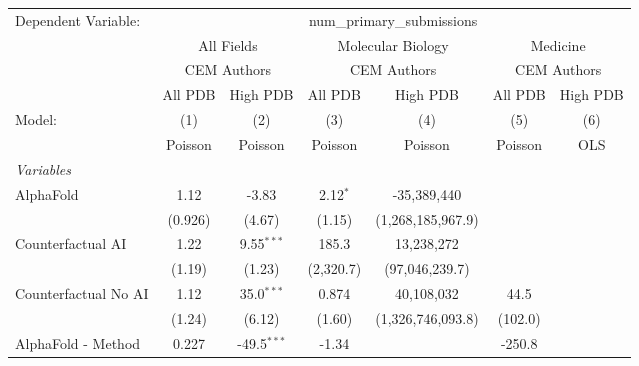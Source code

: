\begingroup
\centering
\begin{tabular}{lcccccc}
   \tabularnewline \midrule \midrule
   Dependent Variable: & \multicolumn{6}{c}{num\_primary\_submissions}\\
 & \multicolumn{2}{c}{All Fields} & \multicolumn{2}{c}{Molecular Biology} & \multicolumn{2}{c}{Medicine} \\
\cmidrule(lr){2-3} \cmidrule(lr){4-5} \cmidrule(lr){6-7}
 & \multicolumn{2}{c}{CEM Authors} & \multicolumn{2}{c}{CEM Authors} & \multicolumn{2}{c}{CEM Authors} \\
\cmidrule(lr){2-3} \cmidrule(lr){4-5} \cmidrule(lr){6-7}
 & \multicolumn{1}{c}{All PDB} & \multicolumn{1}{c}{High PDB} & \multicolumn{1}{c}{All PDB} & \multicolumn{1}{c}{High PDB} & \multicolumn{1}{c}{All PDB} & \multicolumn{1}{c}{High PDB} \\
\cmidrule(lr){2-2} \cmidrule(lr){3-3} \cmidrule(lr){4-4} \cmidrule(lr){5-5} \cmidrule(lr){6-6} \cmidrule(lr){7-7}
   Model:                                                     & (1)           & (2)           & (3)        & (4)                   & (5)     & (6)\\  
                                                              &  Poisson      & Poisson       & Poisson    & Poisson               & Poisson & OLS\\  
   \midrule
   \emph{Variables}\\
   AlphaFold                                                  & 1.12          & -3.83         & 2.12$^{*}$ & -35,389,440           &         &   \\   
                                                              & (0.926)       & (4.67)        & (1.15)     & (1,268,185,967.9)     &         &   \\   
   Counterfactual AI                                          & 1.22          & 9.55$^{***}$  & 185.3      & 13,238,272            &         &   \\   
                                                              & (1.19)        & (1.23)        & (2,320.7)  & (97,046,239.7)        &         &   \\   
   Counterfactual No AI                                       & 1.12          & 35.0$^{***}$  & 0.874      & 40,108,032            & 44.5    &   \\   
                                                              & (1.24)        & (6.12)        & (1.60)     & (1,326,746,093.8)     & (102.0) &   \\   
   AlphaFold - Method                                         & 0.227         & -49.5$^{***}$ & -1.34      &                       & -250.8  &   \\   

\end{tabular}
